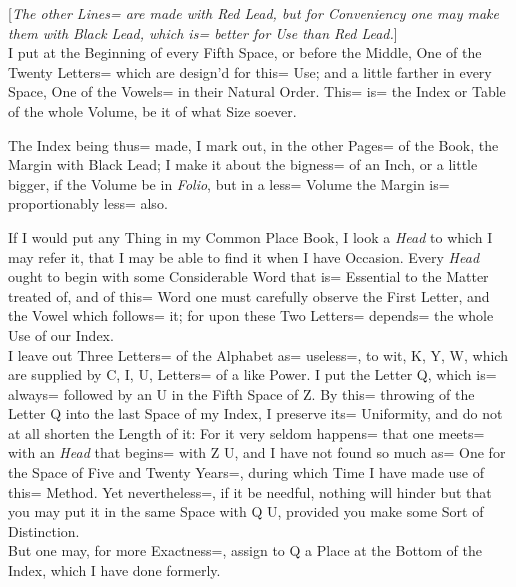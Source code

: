 [{\itshape The other Lines= are made with Red Lead,
but for Conveniency one may make them with Black Lead,
which is= better for Use than Red Lead.}]\\

I put at the Beginning of every Fifth Space, or before the Middle,
One of the Twenty Letters= which are design'd for this= Use;
and a little farther in every Space,
One of the Vowels= in their Natural Order.
This= is= the Index or Table of the whole Volume,
be it of what Size soever.

The Index being thus= made, I mark out,
in the other Pages= of the Book, the Margin with Black Lead;
I make it about the bigness= of an Inch,
or a little bigger, if the Volume be in \emph{Folio},
but in a less= Volume the Margin is= proportionably less= also.

If I would put any Thing in my Common Place Book,
I look a \emph{Head} to which I may refer it,
that I may be able to find it when I have Occasion.
Every \emph{Head} ought to begin with some Considerable Word that is= Essential to the Matter treated of,
and of this= Word one must carefully observe the First Letter,
and the Vowel which follows= it;
for upon these Two Letters= depends= the whole Use of our Index.\\

I leave out Three Letters= of the Alphabet as= useless=,
to wit, K, Y, W, which are supplied by C, I, U, Letters= of a like Power.
I put the Letter Q, which is= always= followed by an U in the Fifth Space of Z.
By this= throwing of the Letter Q into the last Space of my Index,
I preserve its= Uniformity, and do not at all shorten the Length of it:
For it very seldom happens= that one meets= with an \emph{Head} that begins= with Z U,
and I have not found so much as= One for the Space of Five and Twenty Years=,
during which Time I have made use of this= Method.
Yet nevertheless=, if it be needful,
nothing will hinder but that you may put it in the same Space with Q U,
provided you make some Sort of Distinction.\\

But one may, for more Exactness=,
assign to Q a Place at the Bottom of the Index,
which I have done formerly.\\

